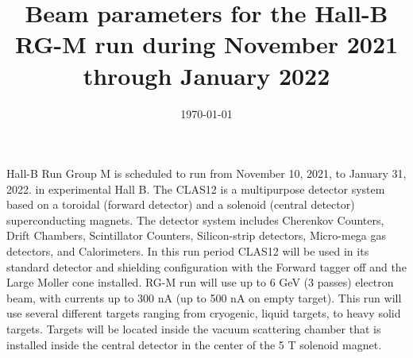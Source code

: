 \documentclass[12pt]{article}
\begin{document}
\title{Beam parameters for the Hall-B RG-M run during November 2021 through January 2022}
\author{}
\date{\today}
\maketitle

Hall-B Run Group M is scheduled to run from November 10, 2021, to January 31, 2022. in experimental Hall B. The CLAS12 is a multipurpose detector system based on a toroidal (forward detector) and a solenoid (central  detector) superconducting magnets. The detector system includes Cherenkov Counters, Drift Chambers, Scintillator Counters, Silicon-strip detectors, Micro-mega gas detectors, and Calorimeters. In this run period CLAS12 will be used in its standard detector and shielding configuration with the Forward tagger off and the Large Moller cone installed. RG-M run will use up to 6 GeV (3 passes) electron beam, with currents up to 300 nA (up to 500 nA on empty target). This run will use several different targets ranging from cryogenic, liquid targets, to heavy solid targets. Targets will be located inside the vacuum scattering chamber that is installed inside the central detector in the center of the 5 T solenoid magnet. 
\end{document}
